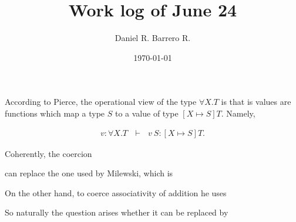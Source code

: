 \documentclass{amsart}
\title{Work log of June 24}
\author{Daniel R. Barrero R.}
\date{\today}
\begin{document}
\maketitle

\section{}

According to Pierce, the operational view of the type $\forall X . T$ is that is values are
functions which map a type $S$ to a value of type $[X \mapsto S]T$. Namely,

\begin{eqnarray*}
	v : \forall X . T \ \ \ \vdash \ \ \ v \ S : [X \mapsto S]T.
\end{eqnarray*}

\bigskip

Coherently, the coercion



\bigskip

can replace the one used by Milewski, which is



\bigskip

On the other hand, to coerce associativity of addition he uses



\bigskip

So naturally the question arises whether it can be replaced by


\end{document}
